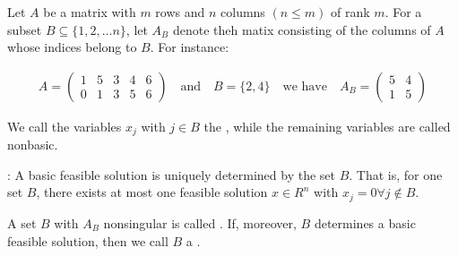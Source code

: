   \par Let $A$ be a matrix with $m$ rows and $n$ columns $(n \leq m)$ of rank $m$. For a subset $B \subseteq \{1, 2, \ldots n\}$, let $A_B$ denote theh matix consisting of the columns of $A$ whose indices belong to $B$. For instance:

  \begin{align*}
    A =
    \begin{pmatrix}
      1 & 5 & 3 & 4 & 6 \\
      0 & 1 & 3 & 5 & 6
    \end{pmatrix}
    \quad \text{and} \quad B = \{2, 4\} \quad \text{we have} \quad
    A_B =
    \begin{pmatrix}
      5 & 4 \\
      1 & 5
    \end{pmatrix}
  \end{align*}

  \par {}
  \vspace{0.5cm}

  \par We call the variables $x_j$ with $j \in B$ the , while the remaining variables are called nonbasic.

  \par {}: A basic feasible solution is uniquely determined by the set $B$. That is, for one set $B$, there exists at most one feasible solution $x \in R^n$ with $x_j = 0 \forall j \not \in B$.

  \par A set $B$ with $A_B$ nonsingular is called . If, moreover, $B$ determines a
basic feasible solution, then we call $B$ a .

